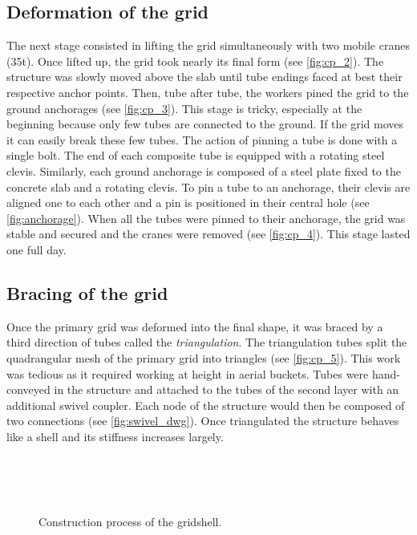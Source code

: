 \subsection{Deformation of the grid}
The next stage consisted in lifting the grid simultaneously with two mobile cranes (35t). Once lifted up, the grid took nearly its final form (see \cref{fig:cp_2}). The structure was slowly moved above the slab until tube endings faced at best their respective anchor points. Then, tube after tube, the workers pined the grid to the ground anchorages (see \cref{fig:cp_3}). This stage is tricky, especially at the beginning because only few tubes are connected to the ground. If the grid moves it can easily break these few tubes. The action of pinning a tube is done with a single bolt. The end of each composite tube is equipped with a rotating steel clevis. Similarly, each ground anchorage is composed of a steel plate fixed to the concrete slab and a rotating clevis. To pin a tube to an anchorage, their clevis are aligned one to each other and a pin is positioned in their central hole (see \cref{fig:anchorage}). When all the tubes were pinned to their anchorage, the grid was stable and secured and the cranes were removed (see \cref{fig:cp_4}). This stage lasted one full day.

\subsection{Bracing of the grid}
Once the primary grid was deformed into the final shape, it was braced by a third direction of tubes called the \emph{triangulation}. The triangulation tubes split the quadrangular mesh of the primary grid into triangles (see \cref{fig:cp_5}). This work was tedious as it required working at height in aerial buckets. Tubes were hand-conveyed in the structure and attached to the tubes of the second layer with an additional swivel coupler. Each node of the structure would then be composed of two connections (see \cref{fig:swivel_dwg}). Once triangulated the structure behaves like a shell and its stiffness increases largely.

\begin{figure}[p]
     	\centering
	\begin{fullpage}	
		\hspace*{\fill}
		 \\
		\hspace*{\fill}
		 \\
		\hspace*{\fill}
		 \\
		\vspace{10pt}
		\caption{Construction process of the gridshell.}
		\label{fig:erection}    
	\end{fullpage}
\end{figure}

